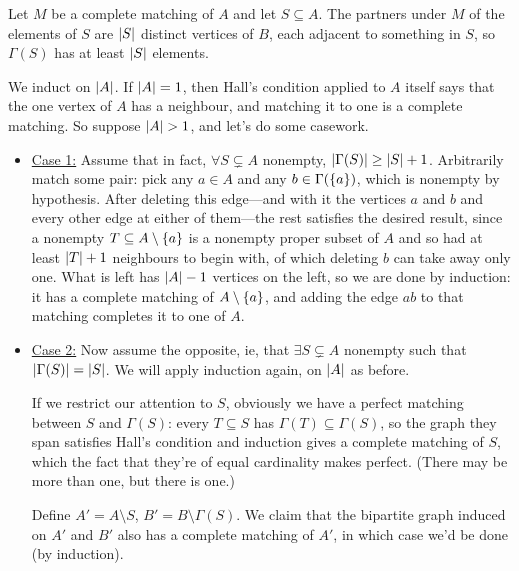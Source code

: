 \begin{iffproof}
    \onlyifdir Let $M$ be a complete matching of $A$ and let $S \subseteq A$. The partners under $M$ of the elements of $S$ are $\left\lvert S \right\rvert$ distinct vertices of $B$, each adjacent to something in $S$, so $\Gamma(S)$ has at least $\left\lvert S \right\rvert$ elements.

    \ifdir We induct on $\left\lvert A \right\rvert$. If $\left\lvert A \right\rvert = 1$, then Hall's condition applied to $A$ itself says that the one vertex of $A$ has a neighbour, and matching it to one is a complete matching. So suppose $\left\lvert A \right\rvert > 1$, and let's do some casework.
    \begin{itemize}
        \item \underline{Case 1:} Assume that in fact, $\forall S \subsetneq A$ nonempty, $\left\lvert \Gamma(S) \right\rvert \geq \left\lvert S \right\rvert + 1$. Arbitrarily match some pair: pick any $a \in A$ and any $b \in \Gamma(\left\{ a \right\})$, which is nonempty by hypothesis. After deleting this edge---and with it the vertices $a$ and $b$ and every other edge at either of them---the rest satisfies the desired result, since a nonempty $T \subseteq A \setminus \left\{ a \right\}$ is a nonempty proper subset of $A$ and so had at least $\left\lvert T \right\rvert + 1$ neighbours to begin with, of which deleting $b$ can take away only one. What is left has $\left\lvert A \right\rvert - 1$ vertices on the left, so we are done by induction: it has a complete matching of $A \setminus \left\{ a \right\}$, and adding the edge $ab$ to that matching completes it to one of $A$.

            \item \underline{Case 2:} Now assume the opposite, ie, that $\exists S \subsetneq A$ nonempty such that $\left\lvert \Gamma(S) \right\rvert = \left\lvert S \right\rvert$. We will apply induction again, on $\left\lvert A \right\rvert$ as before.

            If we restrict our attention to $S$, obviously we have a perfect matching between $S$ and $\Gamma(S)$: every $T \subseteq S$ has $\Gamma(T) \subseteq \Gamma(S)$, so the graph they span satisfies Hall's condition and induction gives a complete matching of $S$, which the fact that they're of equal cardinality makes perfect. (There may be more than one, but there is one.)

            Define $A' = A \setminus S$, $B' = B \setminus \Gamma(S)$. We claim that the bipartite graph induced on $A'$ and $B'$ also has a complete matching of $A'$, in which case we'd be done (by induction).


\end{itemize}
\end{iffproof}
